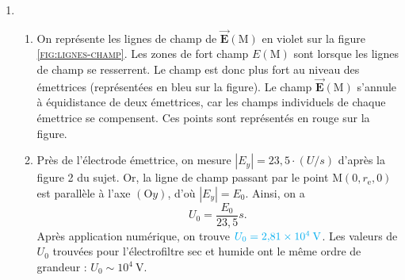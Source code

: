 \documentclass[a4paper, 10pt]{article}
\makeatletter
\let\@ref\ref
\def\ref#1{\textsc{\@ref{#1}}}
\let\@vec\vec
\renewcommand{\vec}[1]{\ensuremath{\@vec{\mathbf{#1}}}}
\def\res#1{{\color{cyan}#1}}
\makeatother
\begin{document}
	\begin{multicols}{2}
		\begin{enumerate}[start=4]
			\item[]
				\begin{enumerate}[start=2]
					\item
						On représente les lignes de champ de $\vec{E}(\mathrm{M})$\/ en violet sur la figure \ref{fig:lignes-champ}.
						Les zones de fort champ $E(\mathrm{M})$\/ sont lorsque les lignes de champ se resserrent. Le champ est donc plus fort au niveau des émettrices (représentées en bleu sur la figure).
						Le champ $\vec{E}(\mathrm{M})$\/ s'annule à équidistance de deux émettrices, car les champs individuels de chaque émettrice se compensent. Ces points sont représentés en rouge sur la figure.
					\item Près de l'électrode émettrice, on mesure $|E_y| = 23{,}5\cdot (U/s)$\/ d'après la figure 2 du sujet. Or, la ligne de champ passant par le point $\mathrm{M}(0, r_\mathrm{e}, 0)$\/ est parallèle à l'axe $(\mathrm{O}y)$, d'où $|E_y| = E_0$.
						Ainsi, on a \[
							\boxed{U_0 = \frac{E_0}{23{,}5} s.}
						\]
						Après application numérique, on trouve $\res{U_0 = 2{,}81 \times 10^4\:\mathrm{V}}$. Les valeurs de $U_0$\/ trouvées pour l'électrofiltre sec et humide ont le même ordre de grandeur : $U_0 \sim 10^4\:\mathrm{V}$.
				\end{enumerate}
		\end{enumerate}

\end{multicols}
\end{document}
